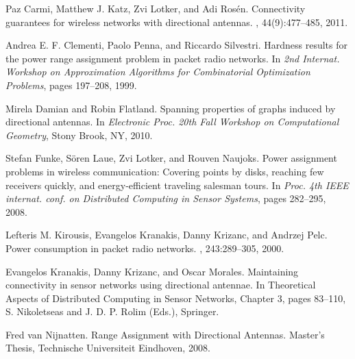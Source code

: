 \documentclass[11pt,letter]{article}
\begin{document}
\begin{thebibliography}{1}
Paz Carmi, Matthew J. Katz, Zvi Lotker, and Adi Ros\'{e}n.
\newblock Connectivity guarantees for wireless networks with directional antennas.
, 44(9):477--485, 2011.

Andrea E. F. Clementi, Paolo Penna, and Riccardo Silvestri.
\newblock Hardness results for the power range assignment problem in packet radio networks.
\newblock In {\em 2nd Internat. Workshop on Approximation Algorithms for Combinatorial Optimization Problems}, pages 197--208, 1999.

Mirela Damian and Robin Flatland.
\newblock Spanning properties of graphs induced by directional antennas.
\newblock In {\em Electronic Proc. 20th Fall Workshop on Computational Geometry},
Stony Brook, NY, 2010.

Stefan Funke, S\"{o}ren Laue, Zvi Lotker, and Rouven Naujoks.
\newblock Power assignment problems in wireless communication: Covering points by disks, reaching
few receivers quickly, and energy-efficient traveling salesman tours.
\newblock In {\em Proc. 4th IEEE internat. conf. on Distributed Computing in Sensor Systems}, pages 282--295, 2008.

Lefteris M. Kirousis, Evangelos Kranakis, Danny Krizanc, and Andrzej Pelc.
\newblock Power consumption in packet radio networks.
, 243:289--305, 2000.









Evangelos Kranakis, Danny Krizanc, and Oscar Morales.
\newblock Maintaining connectivity in sensor networks using directional antennae.
In Theoretical Aspects of Distributed Computing in Sensor Networks, Chapter 3, pages 83--110, S. Nikoletseas and J. D. P. Rolim (Eds.), Springer.

Fred van Nijnatten.
\newblock Range Assignment with Directional Antennas.
\newblock Master's Thesis, Technische Universiteit Eindhoven, 2008.

\end{thebibliography}
\end{document}
